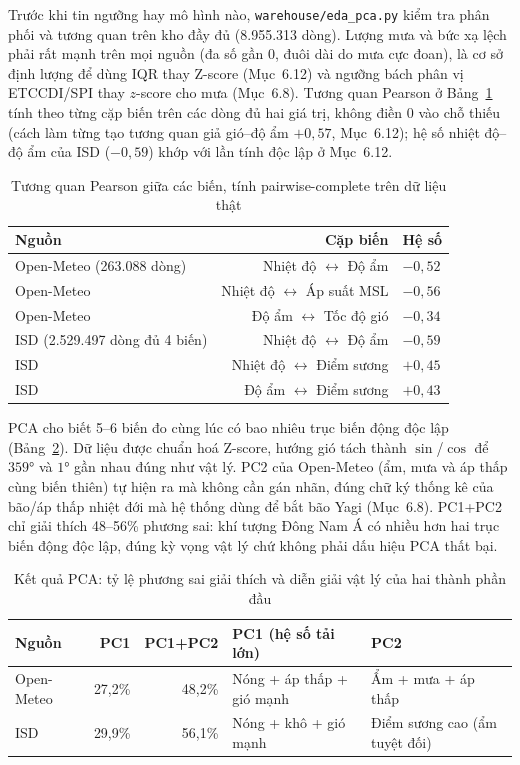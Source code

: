 \documentclass[12pt,a4paper]{report}
\begin{document}
Trước khi tin ngưỡng hay mô hình nào, \texttt{warehouse/eda\_pca.py} kiểm tra phân phối và tương quan
trên kho đầy đủ (8.955.313 dòng). Lượng mưa và bức xạ lệch phải rất mạnh trên mọi nguồn (đa số gần 0,
đuôi dài do mưa cực đoan), là cơ sở định lượng để dùng IQR thay Z-score (Mục~6.12) và ngưỡng bách phân
vị ETCCDI/SPI thay $z$-score cho mưa (Mục~6.8). Tương quan Pearson ở Bảng~\ref{tab:correlation} tính
theo từng cặp biến trên các dòng đủ hai giá trị, không điền 0 vào chỗ thiếu (cách làm từng tạo tương
quan giả gió--độ ẩm $+0{,}57$, Mục~6.12); hệ số nhiệt độ--độ ẩm của ISD ($-0{,}59$) khớp với lần tính
độc lập ở Mục~6.12.

\begin{table}[H]
\centering\small
\caption{Tương quan Pearson giữa các biến, tính pairwise-complete trên dữ liệu thật}
\label{tab:correlation}
\begin{tabular}{@{}lrl@{}}
\toprule
\textbf{Nguồn} & \textbf{Cặp biến} & \textbf{Hệ số} \\
\midrule
Open-Meteo (263.088 dòng) & Nhiệt độ $\leftrightarrow$ Độ ẩm & $-0{,}52$ \\
Open-Meteo & Nhiệt độ $\leftrightarrow$ Áp suất MSL & $-0{,}56$ \\
Open-Meteo & Độ ẩm $\leftrightarrow$ Tốc độ gió & $-0{,}34$ \\
ISD (2.529.497 dòng đủ 4 biến) & Nhiệt độ $\leftrightarrow$ Độ ẩm & $-0{,}59$ \\
ISD & Nhiệt độ $\leftrightarrow$ Điểm sương & $+0{,}45$ \\
ISD & Độ ẩm $\leftrightarrow$ Điểm sương & $+0{,}43$ \\
\bottomrule
\end{tabular}
\end{table}

PCA cho biết 5--6 biến đo cùng lúc có bao nhiêu trục biến động độc lập (Bảng~\ref{tab:pca}). Dữ liệu
được chuẩn hoá Z-score, hướng gió tách thành $\sin$/$\cos$ để $359°$ và $1°$ gần nhau đúng như vật lý.
PC2 của Open-Meteo (ẩm, mưa và áp thấp cùng biến thiên) tự hiện ra mà không cần gán nhãn, đúng chữ ký
thống kê của bão/áp thấp nhiệt đới mà hệ thống dùng để bắt bão Yagi (Mục~6.8). PC1+PC2 chỉ giải thích
48--56\% phương sai: khí tượng Đông Nam Á có nhiều hơn hai trục biến động độc lập, đúng kỳ vọng vật lý
chứ không phải dấu hiệu PCA thất bại.

\begin{table}[H]
\centering\small
\caption{Kết quả PCA: tỷ lệ phương sai giải thích và diễn giải vật lý của hai thành phần đầu}
\label{tab:pca}
\begin{tabular}{@{}lrrp{3.3cm}p{3.3cm}@{}}
\toprule
\textbf{Nguồn} & \textbf{PC1} & \textbf{PC1+PC2} & \textbf{PC1 (hệ số tải lớn)} & \textbf{PC2} \\
\midrule
Open-Meteo & 27,2\% & 48,2\% & Nóng + áp thấp + gió mạnh & Ẩm + mưa + áp thấp \\
ISD & 29,9\% & 56,1\% & Nóng + khô + gió mạnh & Điểm sương cao (ẩm tuyệt đối) \\
\bottomrule
\end{tabular}
\end{table}
\end{document}

